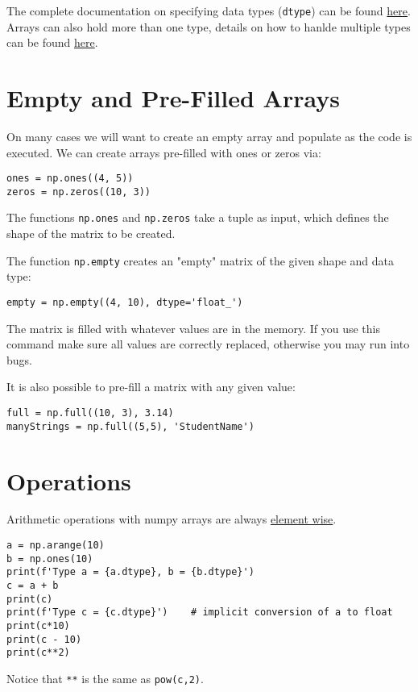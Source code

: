 \documentclass[12pt, a4paper]{article}
\begin{document}
The complete documentation on specifying data types (\texttt{dtype}) can be found \href{https://docs.scipy.org/doc/numpy/reference/arrays.dtypes.html\#arrays-dtypes}{here}.
Arrays can also hold more than one type, details on how to hanlde multiple types can be found \href{https://docs.scipy.org/doc/numpy/user/basics.rec.html\#module-numpy.doc.structured\_arrays}{here}.
\section{Empty and Pre-Filled Arrays}
\label{sec:orgb77244a}
On many cases we will want to create an empty array and populate as the code is executed.
We can create arrays pre-filled with ones or zeros via:
\lstset{language=jupyter-python,label= ,caption= ,captionpos=b,numbers=none}
\begin{lstlisting}
ones = np.ones((4, 5))
zeros = np.zeros((10, 3))
\end{lstlisting}
The functions \texttt{np.ones} and \texttt{np.zeros} take a tuple as input, which defines the shape of the matrix to be created.

The function \texttt{np.empty} creates an "empty" matrix of the given shape and data type:
\lstset{language=jupyter-python,label= ,caption= ,captionpos=b,numbers=none}
\begin{lstlisting}
empty = np.empty((4, 10), dtype='float_')
\end{lstlisting}
The matrix is filled with whatever values are in the memory.
If you use this command make sure all values are correctly replaced, otherwise you may run into bugs.

It is also possible to pre-fill a matrix with any given value:
\lstset{language=jupyter-python,label= ,caption= ,captionpos=b,numbers=none}
\begin{lstlisting}
full = np.full((10, 3), 3.14)
manyStrings = np.full((5,5), 'StudentName')
\end{lstlisting}
\section{Operations}
\label{sec:org9efda68}
Arithmetic operations with numpy arrays are always \uline{element wise}.
\lstset{language=jupyter-python,label= ,caption= ,captionpos=b,numbers=none}
\begin{lstlisting}
a = np.arange(10)
b = np.ones(10)
print(f'Type a = {a.dtype}, b = {b.dtype}')
c = a + b
print(c)
print(f'Type c = {c.dtype}')    # implicit conversion of a to float
print(c*10)
print(c - 10)
print(c**2)
\end{lstlisting}
Notice that \texttt{**} is the same as \texttt{pow(c,2)}.
\end{document}
